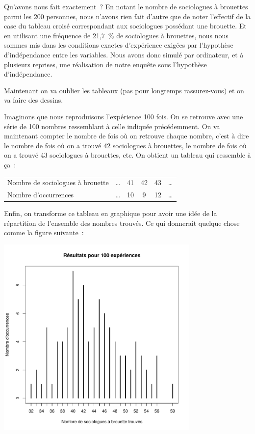\documentclass[a4paper,10pt,twoside,francais]{report}
\begin{document}
Qu'avons nous fait exactement~? En notant le nombre de sociologues à
brouettes parmi les 200 personnes, nous n'avons rien fait d'autre que
de noter l'effectif de la case du tableau croisé correspondant aux
sociologues possédant une brouette. Et en utilisant une fréquence de
21,7~\% de sociologues à brouettes, nous nous sommes mis dans les
conditions exactes d'expérience exigées par l'hypothèse d'indépendance
entre les variables. Nous avons donc simulé par ordinateur, et à
plusieurs reprises, une réalisation de notre enquête sous l'hypothèse
d'indépendance.

Maintenant on va oublier les tableaux (pas pour longtemps
rassurez-vous) et on va faire des dessins.

Imaginons que nous reproduisons l'expérience 100 fois. On se retrouve
avec une série de 100 nombres ressemblant à celle indiquée
précédemment. On va maintenant compter le nombre de fois où on
retrouve chaque nombre, c'est à dire le nombre de fois où on a trouvé
42 sociologues à brouettes, le nombre de fois où on a trouvé 43
sociologues à brouettes, etc. On obtient un tableau qui ressemble à
ça~:

\begin{center}
  \begin{tabular}{lccccc}
    \toprule
    Nombre de sociologues à brouette & \ldots & 41 & 42  & 43 & \ldots \\
    Nombre d'occurrences &  \ldots & 10 & 9 & 12 & \ldots \\
    \bottomrule
  \end{tabular}
\end{center}

Enfin, on transforme ce tableau en graphique pour avoir une idée de la
répartition de l'ensemble des nombres trouvés. Ce qui donnerait
quelque chose comme la figure suivante~:

\begin{center}
  \includegraphics[width=10cm]{images/exp100.pdf}
\end{center}
\end{document}
